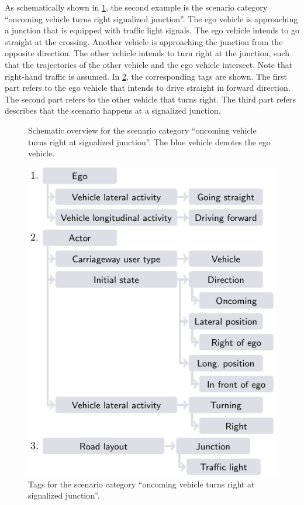 As schematically shown in \cref{fig:scheme oncoming turning}, the second example is the scenario category ``oncoming vehicle turns right signalized junction''.
The ego vehicle is approaching a junction that is equipped with traffic light signals. The ego vehicle intends to go straight at the crossing. Another vehicle is approaching the junction from the opposite direction. The other vehicle intends to turn right at the junction, such that the trajectories of the other vehicle and the ego vehicle intersect. Note that right-hand traffic is assumed.
In \cref{fig:tags oncoming turning}, the corresponding tags are shown. The first part refers to the ego vehicle that intends to drive straight in forward direction. The second part refers to the other vehicle that turns right. The third part refers describes that the scenario happens at a signalized junction.


\setlength{\figurewidth}{15.0em}
\begin{figure}[t]
	\centering
	
	\caption{Schematic overview for the scenario category ``oncoming vehicle turns right at signalized junction''. The blue vehicle denotes the ego vehicle.}
	\label{fig:scheme oncoming turning}
\end{figure}
\begin{figure}[t]
	\centering
	\includegraphics{figures/oncoming_turning}
	\caption{Tags for the scenario category ``oncoming vehicle turns right at signalized junction''.}
	\label{fig:tags oncoming turning}
\end{figure}
